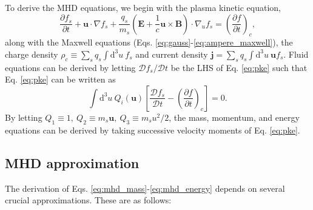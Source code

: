 To derive the MHD equations, we begin with the plasma kinetic equation,
\begin{equation}
\label{eq:pke}
\frac{\partial f_s}{\partial t} + \mathbf{u}\cdot\nabla f_s + \frac{q_s}{m_s}\left(\mathbf{E} + \frac{1}{c}\mathbf{u}\times\mathbf{B}\right)\cdot\nabla_uf_s = \left(\frac{\partial f}{\partial t}\right)_c,
\end{equation}
along with the Maxwell equations (Eqs. \ref{eq:gauss}-\ref{eq:ampere_maxwell}), the charge density $\rho_c\equiv\sum_sq_s\int\mathrm{d}^3u~f_s$ and current density $\mathbf{j}=\sum_sq_s\int\mathrm{d}^3u~\mathbf{u}f_s$. Fluid equations can be derived by letting $\mathcal{D}f_s/\mathcal{D}t$ be the LHS of Eq. \ref{eq:pke} such that Eq. \ref{eq:pke} can be written as
\begin{equation}
\int\mathrm{d}^3u~Q_i(\mathbf{u})\left[\frac{\mathcal{D}f_s}{\mathcal{D}t}-\left(\frac{\partial f}{\partial t}\right)_c\right] = 0.
\end{equation}
By letting $Q_1\equiv1,~Q_2\equiv m_s\mathbf{u},~Q_3\equiv m_su^2/2$, the mass, momentum, and energy equations can be derived by taking successive velocity moments of Eq. \ref{eq:pke}.

	\subsection{MHD approximation}

	The derivation of Eqs. \ref{eq:mhd_mass}-\ref{eq:mhd_energy} depends on several crucial approximations. These are as follows:

